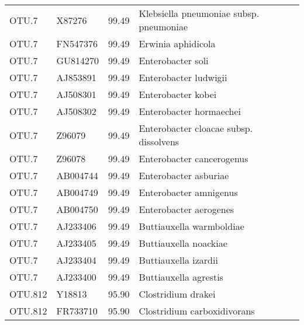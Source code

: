 \begin{tabular}{llrl}
  OTU.7 & X87276 & 99.49 & Klebsiella pneumoniae subsp. pneumoniae \\ 
  OTU.7 & FN547376 & 99.49 & Erwinia aphidicola \\ 
  OTU.7 & GU814270 & 99.49 & Enterobacter soli \\ 
  OTU.7 & AJ853891 & 99.49 & Enterobacter ludwigii \\ 
  OTU.7 & AJ508301 & 99.49 & Enterobacter kobei \\ 
  OTU.7 & AJ508302 & 99.49 & Enterobacter hormaechei \\ 
  OTU.7 & Z96079 & 99.49 & Enterobacter cloacae subsp. dissolvens \\ 
  OTU.7 & Z96078 & 99.49 & Enterobacter cancerogenus \\ 
  OTU.7 & AB004744 & 99.49 & Enterobacter asburiae \\ 
  OTU.7 & AB004749 & 99.49 & Enterobacter amnigenus \\ 
  OTU.7 & AB004750 & 99.49 & Enterobacter aerogenes \\ 
  OTU.7 & AJ233406 & 99.49 & Buttiauxella warmboldiae \\ 
  OTU.7 & AJ233405 & 99.49 & Buttiauxella noackiae \\ 
  OTU.7 & AJ233404 & 99.49 & Buttiauxella izardii \\ 
  OTU.7 & AJ233400 & 99.49 & Buttiauxella agrestis \\ 
  OTU.812 & Y18813 & 95.90 & Clostridium drakei \\ 
  OTU.812 & FR733710 & 95.90 & Clostridium carboxidivorans \\ 
   \hline
\end{tabular}
